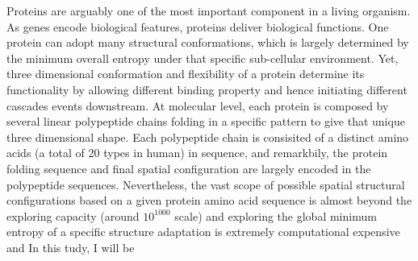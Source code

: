 Proteins are arguably one of the most important component in a living organism. As genes encode biological features, proteins deliver biological functions. One protein can adopt many structural conformations, which is largely determined by the minimum overall entropy under that specific sub-cellular environment. Yet, three dimensional conformation and flexibility of a protein determine its functionality by allowing different binding property and hence initiating different cascades events downstream. At molecular level, each protein is composed by several linear polypeptide chains folding in a specific pattern to give that unique three dimensional shape. Each polypeptide chain is consisited of a distinct amino acids (a total of 20 types in human) in sequence, and remarkbily, the protein folding sequence and final spatial configuration are largely encoded in the polypeptide sequences. Nevertheless, the vast scope of possible spatial structural configurations based on a given protein amino acid sequence is almost beyond the exploring capacity (around $10^{1000}$ scale) and exploring the global minimum entropy of a specific structure adaptation is extremely computational expensive and  In this tudy, I will be 